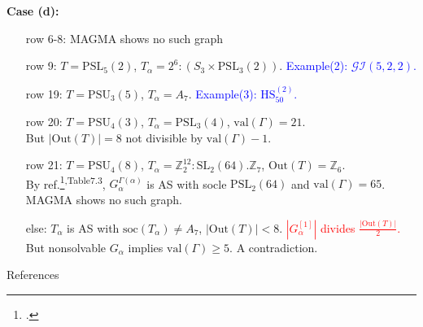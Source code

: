 \documentclass{beamer}
\def\SL{\mathrm{SL}}
\def\PSL{\mathrm{PSL}}
\def\PSU{\mathrm{PSU}}
\def\Out{\mathrm{Out}}
\def\val{\mathrm{val}}
\def\HS{\mathrm{HS}}
\def\GI{\mathcal{GI}}
\def\soc{\mathrm{soc}}
\begin{document}
\begin{frame}
\textbf{Case (d):}
\begin{itemize}\setlength{\itemindent}{1em}
	\item[row 6-8:] MAGMA shows no such graph
	\item[row 9:] $T=\PSL_5(2)$, $T_\alpha=2^6:(S_3\times \PSL_3(2))$. \textcolor{blue}{Example(2): $\GI(5,2,2)$.}
	\item[row 19:] $T=\PSU_3(5)$, $T_\alpha=A_7$. \textcolor{blue}{Example(3): $\HS_{50}^{(2)}$.}
	\item[row 20:] $T=\PSU_4(3)$, $T_\alpha=\PSL_3(4)$, $\val(\Gamma)=21$. \\But $|\Out(T)|=8$ not divisible by $\val(\Gamma)-1$.
	\item[row 21:] $T=\PSU_4(8)$, $T_\alpha=\mathbb{Z}_2^{12}:\SL_2(64).\mathbb{Z}_7$, $\Out(T)=\mathbb{Z}_6$.\\By ref.\footcite{Cameron_1999}\textsuperscript{,Table7.3}, $G_\alpha^{\Gamma(\alpha)}$ is AS with socle $\PSL_2(64)$ and $\val(\Gamma)=65$. \\MAGMA shows no such graph.
	\item[else:] $T_\alpha$ is AS with $\soc(T_\alpha)\neq A_7$, $|\Out(T)|<8$. \textcolor{red}{$|G_\alpha^{[1]}|$ divides $\frac{|\Out(T)|}{2}$.}\\But nonsolvable $G_\alpha$ implies $\val(\Gamma)\geq 5$. A contradiction.
\end{itemize}

\end{frame}






\begin{frame}{References}
\tiny
\printbibliography
\end{frame}
\end{document}
